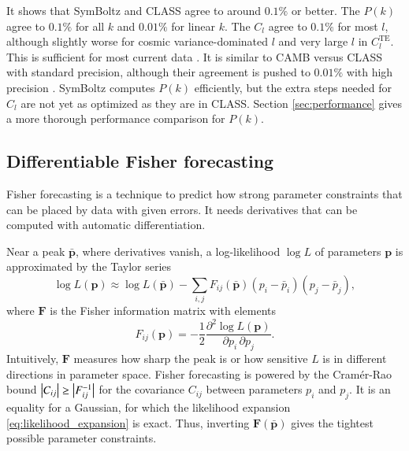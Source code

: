 \documentclass{aa}
\begin{document}
It shows that SymBoltz and CLASS agree to around $0.1\%$ or better.
The $P(k)$ agree to $0.1\%$ for all $k$ and $0.01\%$ for linear $k$.
The $C_l$ agree to $0.1\%$ for most $l$, although slightly worse for cosmic variance-dominated $l$ and very large $l$ in $C_l^\text{TE}$.
This is sufficient for most current data \citep[e.g.,][]{bollietHighaccuracyEmulatorsObservables2024}.
It is similar to CAMB versus CLASS with standard precision,
although their agreement is pushed to $0.01\%$ with high precision \citep{lesgourguesCosmicLinearAnisotropy2011c}.
SymBoltz computes $P(k)$ efficiently, but the extra steps needed for $C_l$ are not yet as optimized as they are in CLASS.
Section \ref{sec:performance} gives a more thorough performance comparison for $P(k)$.

\subsection{Differentiable Fisher forecasting}
\label{sec:fisher}

Fisher forecasting is a technique to predict how strong parameter constraints that can be placed by data with given errors.
It needs derivatives that can be computed with automatic differentiation.

Near a peak $\bar{\boldsymbol{p}}$, where derivatives vanish, a log-likelihood $\log L$ of parameters $\boldsymbol{p}$ is approximated by the Taylor series
\begin{equation}
    \log L(\boldsymbol{p}) \approx \log L(\bar{\boldsymbol{p}}) - \sum_{i,j} F_{ij}(\bar{\boldsymbol{p}}) (p_i - \bar{p}_i) (p_j - \bar{p}_j),
\label{eq:likelihood_expansion}
\end{equation}
where $\boldsymbol{F}$ is the Fisher information matrix with elements
\begin{equation}
    F_{ij}(\boldsymbol{p}) = -\frac12 \frac{\partial^2 \log L(\boldsymbol{p})}{\partial p_i \, \partial p_j} .
\label{eq:fisher_general}
\end{equation}
Intuitively, $\boldsymbol{F}$ measures how sharp the peak is or how sensitive $L$ is in different directions in parameter space.
Fisher forecasting is powered by the Cramér-Rao bound $\big\lvert \smash{C_{ij}} \big\rvert \geq \big\lvert \smash{F^{-1}_{ij}} \big\rvert $ for the covariance $C_{ij}$ between parameters $p_i$ and $p_j$.
It is an equality for a Gaussian, for which the likelihood expansion \eqref{eq:likelihood_expansion} is exact.
Thus, inverting $\boldsymbol{F}(\bar{\boldsymbol{p}})$ gives the tightest possible parameter constraints.
\end{document}
